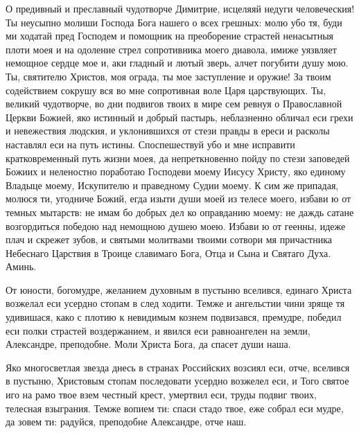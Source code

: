 

О предивный и преславный чудотворче Димитрие, исцеляяй недуги человеческия! Ты неусыпно молиши Господа Бога нашего о всех грешных: молю убо тя, буди ми ходатай пред Господем и помощник на преоборение страстей ненасытныя плоти моея и на одоление стрел сопротивника моего диавола, имиже уязвляет немощное сердце мое и, аки гладный и лютый зверь, алчет погубити душу мою. Ты, святителю Христов, моя ограда, ты мое заступление и оружие! За твоим содействием сокрушу вся во мне сопротивная воле Царя царствующих. Ты, великий чудотворче, во дни подвигов твоих в мире сем ревнуя о Православной Церкви Божией, яко истинный и добрый пастырь, неблазненно обличал еси грехи и невежествия людския, и уклонившихся от стези правды в ереси и расколы наставлял еси на путь истины. Споспешествуй убо и мне исправити кратковременный путь жизни моея, да непреткновенно пойду по стези заповедей Божиих и неленостно поработаю Господеви моему Иисусу Христу, яко единому Владыце моему, Искупителю и праведному Судии моему. К сим же припадая, молюся ти, угодниче Божий, егда изыти души моей из телесе моего, избави ю от темных мытарств: не имам бо добрых дел ко оправданию моему: не даждь сатане возгордиться победою над немощною душею моею. Избави ю от геенны, идеже плач и скрежет зубов, и святыми молитвами твоими сотвори мя причастника Небеснаго Царствия в Троице славимаго Бога, Отца и Сына и Святаго Духа. Аминь.
\longpage[2]{}\mychapterending

 


От юности, богомудре, желанием духовным в пустыню вселився, единаго Христа возжелал еси усердно стопам в след ходити. Темже и ангельстии чини зряще тя удивишася, како с плотию к невидимым кознем подвизався, премудре, победил еси полки страстей воздержанием, и явился еси равноангелен на земли, Александре, преподобне. Моли Христа Бога, да спасет души наша.




Яко многосветлая звезда днесь в странах Российских возсиял еси, отче, вселився в пустыню, Христовым стопам последовати усердно возжелел еси, и Того святое иго на рамо твое взем честный крест, умертвил еси, труды подвиг твоих, телесная взыграния. Темже вопием ти: спаси стадо твое, еже собрал еси мудре, да зовем ти: радуйся, преподобне Александре, отче наш.


